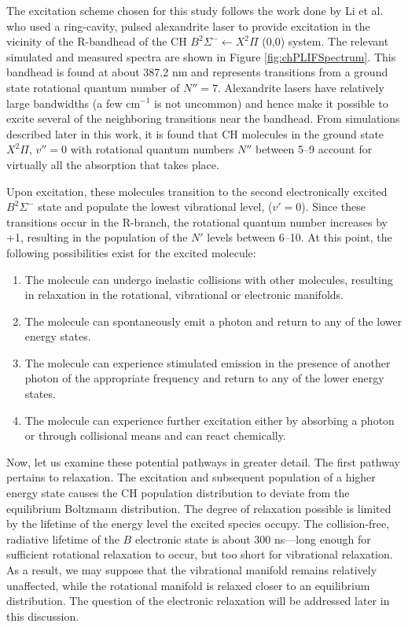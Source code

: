 The excitation scheme chosen for this study follows the work done by Li et al.\cite{2007-li-a} who used a ring-cavity, pulsed alexandrite laser to provide excitation in the vicinity of the R-bandhead of the CH \(B^2\Sigma^- \leftarrow X^2\Pi\) (0,0) system.
The relevant simulated and measured spectra are shown in Figure \ref{fig:chPLIFSpectrum}.
This bandhead is found at about 387.2 nm and represents transitions from a ground state rotational quantum number of \(N''=7\).
Alexandrite lasers have relatively large bandwidths (a few cm\(^{-1}\) is not uncommon) and hence make it possible to excite several of the neighboring transitions near the bandhead.
From simulations described later in this work, it is found that CH molecules in the ground state \(X^2\Pi\), \(v''=0\) with rotational quantum numbers \(N''\) between 5--9 account for virtually all the absorption that takes place.

Upon excitation, these molecules transition to the second electronically excited \(B^2\Sigma^-\) state and populate the lowest vibrational level, (\(v'=0\)).
Since these transitions occur in the R-branch, the rotational quantum number increases by +1, resulting in the population of the \(N'\) levels between 6--10.
At this point, the following possibilities exist for the excited molecule:

\begin{enumerate}
  \item The molecule can undergo inelastic collisions with other molecules, resulting in relaxation in the rotational, vibrational or electronic manifolds.
  \item The molecule can spontaneously emit a photon and return to any of the lower energy states.
  \item The molecule can experience stimulated emission in the presence of another photon of the appropriate frequency and return to any of the lower energy states.
  \item The molecule can experience further excitation either by absorbing a photon or through collisional means and can react chemically.
\end{enumerate}



Now, let us examine these potential pathways in greater detail.
The first pathway pertains to relaxation.
The excitation and subsequent population of a higher energy state causes the CH population distribution to deviate from the equilibrium Boltzmann distribution.
The degree of relaxation possible is limited by the lifetime of the energy level the excited species occupy.
The collision-free, radiative lifetime of the \(B\) electronic state is about 300 ns\cite{1996-luque-c}---long enough for sufficient rotational relaxation to occur, but too short for vibrational relaxation.
As a result, we may suppose that the vibrational manifold remains relatively unaffected, while the rotational manifold is relaxed closer to an equilibrium distribution.
The question of the electronic relaxation will be addressed later in this discussion.

